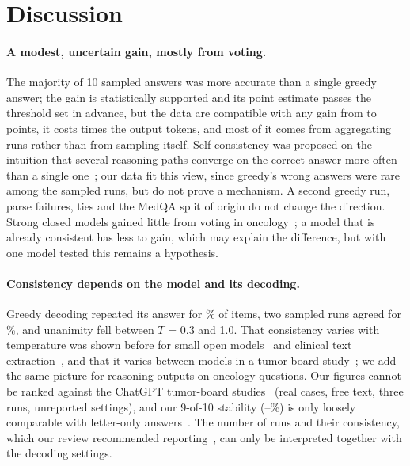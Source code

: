 \section{Discussion}\label{sec:discussion}

\paragraph{A modest, uncertain gain, mostly from voting.} The majority of 10 sampled answers was more accurate than a
single greedy answer; the gain is statistically supported and its point estimate passes the threshold set in advance,
but the data are compatible with any gain from \diffMainLo{} to \diffMainHi{} points, it costs \tokRatio{} times the
output tokens, and most of it comes from aggregating runs rather than from sampling itself. Self-consistency was
proposed on the intuition that several reasoning paths converge on the correct answer more often than a single
one~\cite{wang2022selfconsistency}; our data fit this view, since greedy's wrong answers were rare among the sampled
runs, but do not prove a mechanism. A second greedy run, parse failures, ties and the MedQA split of origin do not
change the direction. Strong closed models gained little from voting in
oncology~\cite{holmes2023,stifini2026,windisch2026}; a model that is already consistent has less to gain, which may
explain the difference, but with one model tested this remains a hypothesis.

\paragraph{Consistency depends on the model and its decoding.} Greedy decoding repeated its answer for
\rerunSamePct\% of items, two sampled runs agreed for \pairAgree\%, and unanimity fell between $T$ = 0.3 and 1.0. That
consistency varies with temperature was shown before for small open models~\cite{pinhanez2025} and clinical text
extraction~\cite{liu2026repro}, and that it varies between models in a tumor-board study~\cite{li2025imitation}; we add
the same picture for reasoning outputs on oncology questions. Our figures cannot be ranked against the ChatGPT
tumor-board studies~\cite{liao2025,asoglu2026} (real cases, free text, three runs, unreported settings), and our 9-of-10
stability (\stableTHigh--\stableTLow\%) is only loosely comparable with letter-only answers~\cite{pinhanez2025}. The
number of runs and their consistency, which our review recommended reporting~\cite{sharma2026review}, can only be
interpreted together with the decoding settings.

